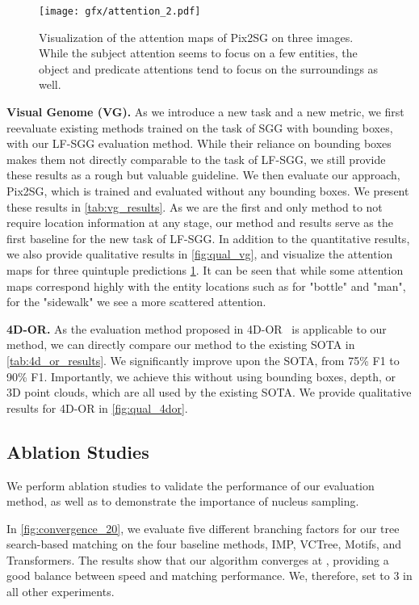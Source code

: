 \documentclass[10pt,twocolumn,letterpaper]{article}
\begin{document}
\begin{figure}[t]
  \centering
  
   \texttt{[image: gfx/attention\_2.pdf]}

   \caption{Visualization of the attention maps of Pix2SG on three images. While the subject attention seems to focus on a few entities, the object and predicate attentions tend to focus on the surroundings as well.}
   \label{fig:attention}
\end{figure}

\noindent\textbf{Visual Genome (VG).} As we introduce a new task and a new metric, we first reevaluate existing methods trained on the task of SGG with bounding boxes, with our LF-SGG evaluation method. While their reliance on bounding boxes makes them not directly comparable to the task of LF-SGG, we still provide these results as a rough but valuable guideline. We then evaluate our approach, Pix2SG, which is trained and evaluated without any bounding boxes. We present these results in \cref{tab:vg_results}. 
As we are the first and only method to not require location information at any stage, our method and results serve as the first baseline for the new task of LF-SGG. In addition to the quantitative results, we also provide qualitative results in \cref{fig:qual_vg}, and visualize the attention maps for three quintuple predictions \cref{fig:attention}. It can be seen that while some attention maps correspond highly with the entity locations such as for "bottle" and "man", for the "sidewalk" we see a more scattered attention. 

\noindent\textbf{4D-OR.} As the evaluation method proposed in 4D-OR~\cite{ozsoy_4d-or_2022} is applicable to our method, we can directly compare our method to the existing SOTA in \cref{tab:4d_or_results}. We significantly improve upon the SOTA, from 75\% F1 to 90\% F1. Importantly, we achieve this without using bounding boxes, depth, or 3D point clouds, which are all used by the existing SOTA. We provide qualitative results for 4D-OR in \cref{fig:qual_4dor}.

\subsection{Ablation Studies}
\label{sec:ablationstudies}
We perform ablation studies to validate the performance of our evaluation method, as well as to demonstrate the importance of nucleus sampling.

In \cref{fig:convergence_20}, we evaluate five different branching factors for our tree search-based matching on the four baseline methods, IMP, VCTree, Motifs, and Transformers. The results show that our algorithm converges at , providing a good balance between speed and matching performance. We, therefore, set  to 3 in all other experiments. 
\end{document}
